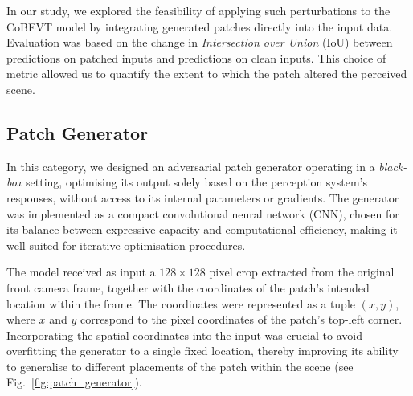 In our study, we explored the feasibility of applying such perturbations to the CoBEVT model by integrating generated patches directly into the input data.
Evaluation was based on the change in \textit{Intersection over Union} (IoU) between predictions on patched inputs and predictions on clean inputs.
This choice of metric allowed us to quantify the extent to which the patch altered the perceived scene.

\subsection{Patch Generator}

In this category, we designed an adversarial patch generator operating in a \textit{black-box} setting, optimising its output solely based on the perception system’s responses, without access to its internal parameters or gradients.  
The generator was implemented as a compact convolutional neural network (CNN), chosen for its balance between expressive capacity and computational efficiency, making it well-suited for iterative optimisation procedures.

The model received as input a \(128 \times 128\) pixel crop extracted from the original front camera frame, together with the coordinates of the patch’s intended location within the frame.  
The coordinates were represented as a tuple \((x, y)\), where \(x\) and \(y\) correspond to the pixel coordinates of the patch’s top-left corner.  
Incorporating the spatial coordinates into the input was crucial to avoid overfitting the generator to a single fixed location, thereby improving its ability to generalise to different placements of the patch within the scene (see Fig.~\ref{fig:patch_generator}).

